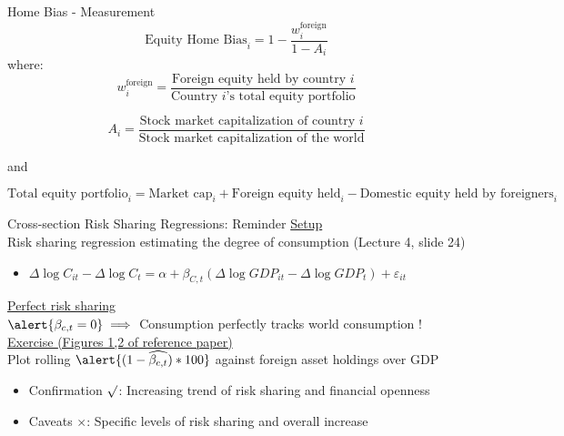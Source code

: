 \documentclass[aspectratio=169, 10pt]{beamer}
\newcommand{\appendixbutton}[2]{%
  \hyperlink{#2}{%
    \beamergotobutton{#1}%
  }%
}
\begin{document}
\begin{frame}{Home Bias - Measurement}
    \begin{equation}
      \text{Equity Home Bias}_i = 1 - \frac{w_i^{\text{foreign}}}{1 - A_i}
    \end{equation}
    where:
    \begin{equation*}
      w_i^{\text{foreign}} = \frac{\text{Foreign equity held by country } i}{\text{Country } i\text{'s total equity portfolio}}
    \end{equation*}

    \begin{equation*}
      A_i = \frac{\text{Stock market capitalization of country } i}{\text{Stock market capitalization of the world}}
    \end{equation*}

    and

    \begin{equation*}
      \text{Total equity portfolio}_i = \text{Market cap}_i + \text{Foreign equity held}_i - \text{Domestic equity held by foreigners}_i
    \end{equation*}
  \end{frame}

\begin{frame}{Cross-section Risk Sharing Regressions: Reminder}
  \underline{Setup} \\
  Risk sharing regression estimating the \alert{degree of consumption} \tiny{(Lecture 4, slide 24)} \normalsize
    \begin{itemize}
    \item $\Delta \log C_{it} - \Delta \log C_t = \alpha + \beta_{C,t}(\Delta \log GDP_{it} - \Delta \log GDP_t) + \varepsilon_{it}$
  \end{itemize}
  \underline{Perfect risk sharing}\\
  $\alert{\beta_{c,t} = 0} \implies$ Consumption perfectly tracks world consumption ! \\[0.2cm]
  \underline{Exercise \tiny{(Figures 1,2 of reference paper)}} \\
  Plot rolling $\alert{(1-\widehat{\beta_{c,t}})*100}$ against foreign asset holdings over GDP
  \begin{itemize}
    \item Confirmation $\surd$: \alert{Increasing trend} of risk sharing and financial openness
    \item Caveats $\times$: Specific \alert{levels} of risk sharing and overall increase
  \end{itemize}
  \vfill
  \footnotesize
  \appendixbutton{Sample}{appendix:sample}
\end{frame}
\end{document}
